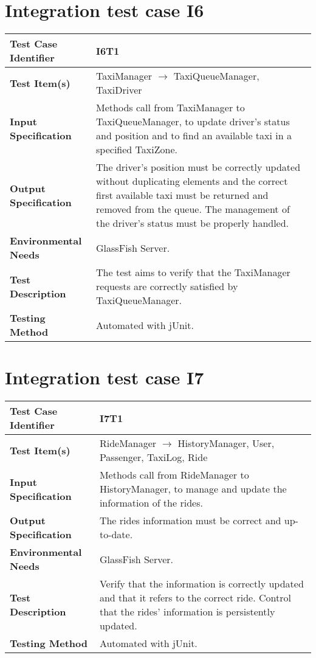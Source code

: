 \vspace{2em}

\section{Integration test case I6}

\begin{tabular}{l p{}}
    \hline
    \textbf{Test Case Identifier} & I6T1\\
    \hline
    \textbf{Test Item(s)} & TaxiManager $\rightarrow$ TaxiQueueManager, TaxiDriver \\
    \hline
    \textbf{Input Specification} & Methods call from TaxiManager to TaxiQueueManager, to update driver's status and position and to find an available taxi in a specified TaxiZone.\\
    \hline
    \textbf{Output Specification} & The driver's position must be correctly updated without duplicating elements and the correct first available taxi must be returned and removed from the queue. The management of the driver's status must be properly handled.\\
    \hline
    \textbf{Environmental Needs} & GlassFish Server.\\
    \hline
    \textbf{Test Description} & The test aims to verify that the TaxiManager requests are correctly satisfied by TaxiQueueManager.\\
    \hline
    \textbf{Testing Method} & Automated with jUnit.\\
    \hline
\end{tabular}

\vspace{2em}

\section{Integration test case I7}

\begin{tabular}{l p{}}
    \hline
    \textbf{Test Case Identifier} & I7T1\\
    \hline
    \textbf{Test Item(s)} & RideManager $\rightarrow$ HistoryManager, User, Passenger, TaxiLog, Ride \\
    \hline
    \textbf{Input Specification} & Methods call from RideManager to HistoryManager, to manage and update the information of the rides.\\
    \hline
    \textbf{Output Specification} & The rides information must be correct and up-to-date.\\
    \hline
    \textbf{Environmental Needs} & GlassFish Server.\\
    \hline
    \textbf{Test Description} & Verify that the information is correctly updated and that it refers to the correct ride. Control that the rides' information is persistently updated.\\
    \hline
    \textbf{Testing Method} & Automated with jUnit.\\
    \hline
\end{tabular}

